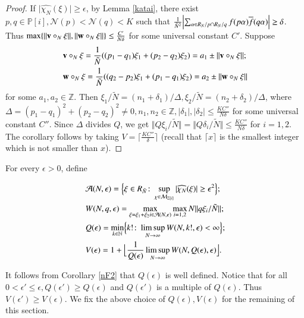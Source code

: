 \documentclass[12pt,amstex]{amsart}
\theoremstyle{definition}
\def \Z {\mathbb{Z}[i]}
\def \P {\mathbb{P}[i]}
\def \A {\alpha}
\def \d {\delta}
\def \e {\epsilon}
\def \R {R_{\tilde{N}}}
\def \v {\bold{v}}
\def \w {\bold{w}}
\def \x {\bold{\xi}}
\begin{document}
\begin{proof}
If $\vert\widehat{\chi_{N}}(\xi)\vert\geq\e$, by Lemma \ref{katai}, there exist $p,q\in\P, \mathcal{N}(p)<\mathcal{N}(q)<K$ such that $\frac{1}{\tilde{N}^{2}}\Bigl\vert\sum_{\A\in R_{N}/p\cap R_{N}/q}f(p\A)\overline{f}(q\A)\Bigr\vert\geq \d$. Thus $\max\{\Vert\v\circ_{N}\x\Vert,\Vert\w\circ_{N}\x\Vert\}\leq \frac{C'}{N\d}$
for some universal constant $C'$.
Suppose
  \begin{equation}\nonumber
  \begin{split}
   &\v\circ_{N}\x=\frac{1}{\tilde{N}}((p_{1}-q_{1})\xi_{1}+(p_{2}-q_{2})\xi_{2})=a_{1}\pm\Vert\v\circ_{N}\x\Vert;
   \\&\w\circ_{N}\x=\frac{1}{\tilde{N}}((q_{2}-p_{2})\xi_{1}+(p_{1}-q_{1})\xi_{2})=a_{2}\pm\Vert\w\circ_{N}\x\Vert
  \end{split}
\end{equation}
for some $a_{1},a_{2}\in\mathbb{Z}$. Then
$\xi_{1}/\tilde{N}=(n_{1}+\d_{1})/\Delta, \xi_{2}/\tilde{N}=(n_{2}+\d_{2})/\Delta$,
where $\Delta=(p_{1}-q_{1})^{2}+(p_{2}-q_{2})^{2}\neq 0, n_{1},n_{2}\in\mathbb{Z}, \vert\d_{1}\vert, \vert\d_{2}\vert\leq\frac{KC''}{N\d}$ for some universal constant $C''$. Since
$\Delta$ divides $Q$, we get $\Vert Q\xi_{i}/\tilde{N}\Vert=\Vert Q\d_{i}/\tilde{N}\Vert\leq\frac{KC''}{N\d}$ for $i=1,2$. The corollary follows by taking $V=\lceil\frac{KC''}{\d}\rceil$ (recall that $\lceil x\rceil$ is the smallest integer which is not smaller than $x$).
\end{proof}

For every $\e>0$, define

  \begin{equation}\nonumber
  \begin{split}
   &\mathcal{A}(N,\e)=\Bigl\{\x\in \R\colon \sup_{\chi\in\mathcal{M}_{\Z}}\vert\widehat{\chi_{N}}(\x)\vert\geq\e^{2}\Bigr\};
   \\&W(N,q,\e)=\max_{\x=\xi_{1}+\xi_{2}i\in\mathcal{A}(N,\e)}\max_{i=1,2}N\Vert q\xi_{i}/\tilde{N}\Vert;
   \\&Q(\e)=\min_{k\in\mathbb{N}}\Bigl\{k!\colon\limsup_{N\rightarrow\infty}W(N,k!,\e)<\infty\Bigr\};
   \\&V(\e)=1+\Bigl\lfloor \frac{1}{Q(\e)}\limsup_{N\rightarrow\infty}W(N,Q(\e),\e)\Bigr\rfloor.
  \end{split}
\end{equation}

It follows from Corollary \ref{nF2} that $Q(\e)$ is well defined. Notice that for all $0<\e'\leq\e, Q(\e')\geq Q(\e)$ and $Q(\e')$ is a multiple of $Q(\e)$. Thus $V(\e')\geq V(\e)$. We fix the above choice of $Q(\e),V(\e)$ for the remaining of this section.
\end{document}
